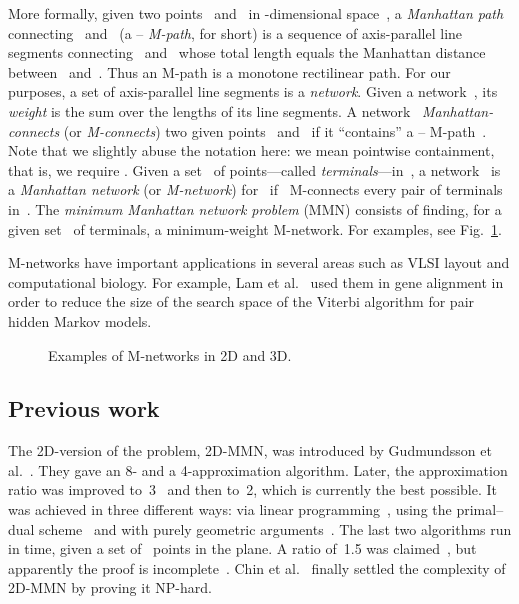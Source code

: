 \documentclass[11pt]{llncs}
\newcommand{\etal}{et al.}
\begin{document}
More formally, given two points~ and~ in -dimensional
space~, a \emph{Manhattan path} connecting~ and~ (a
-- \emph{M-path}, for short) is a sequence of axis-parallel
line segments connecting~ and~ whose total length equals the
Manhattan distance between~ and~.  
Thus an M-path is a monotone rectilinear path.
For our purposes, a set of axis-parallel line segments is a
\emph{network}.  Given a network~, its \emph{weight}  is the
sum over the lengths of its line segments.
A network~ \emph{Manhattan-connects} (or \emph{M-connects}) two
given points~ and~ if it ``contains'' a -- M-path~. 
Note that we slightly abuse the notation here: we 
mean pointwise containment, that is, we require 
.
Given a set~ of points---called \emph{terminals}---in~, a
network~ is a \emph{Manhattan network} (or \emph{M-network})
for~ if~ M-connects every pair of terminals in~.  
The \emph{minimum Manhattan network problem} (MMN) consists of
finding, for a given set~ of terminals, a minimum-weight M-network.
For examples, see Fig.~\ref{fig:examples}.


M-networks have important applications in several areas such as VLSI
layout and computational biology. For example, Lam
\etal~\cite{lap-pafst-03} used them in gene alignment in order to 
reduce 
the size of the search space of the Viterbi algorithm for pair hidden
Markov models.

\begin{figure}[tb]
  \hfill
  \hfill
  \hfill
  \caption{Examples of M-networks in 2D and 3D.}
  \label{fig:examples}
\end{figure}

\subsection{Previous work} 

The 2D-version of the problem, 2D-MMN, was introduced by
Gudmundsson \etal~\cite{gln-ammn-01}.  They gave an 8- and a
4-approximation algorithm.  Later, the approximation ratio was
improved to~3~\cite{bwws-mmnpa-06,fs-s3amm-08t} and then to~2, which
is currently the best possible.  It was achieved in three different
ways: via linear programming~\cite{cnv-raamm-08}, using
the primal--dual scheme~\cite{n-eprmc-05} and with purely geometric
arguments~\cite{gsz-yaa2a-08}.  The last two algorithms run in  time, given a set of~ points in the plane.  A ratio of~1.5 was
claimed~\cite{su-15amm-05}, but apparently the proof is
incomplete~\cite{fs-s3amm-08t}.  
Chin \etal~\cite{cgs-mmnnp-11} finally
settled the complexity of 2D-MMN by proving it NP-hard.
\end{document}
